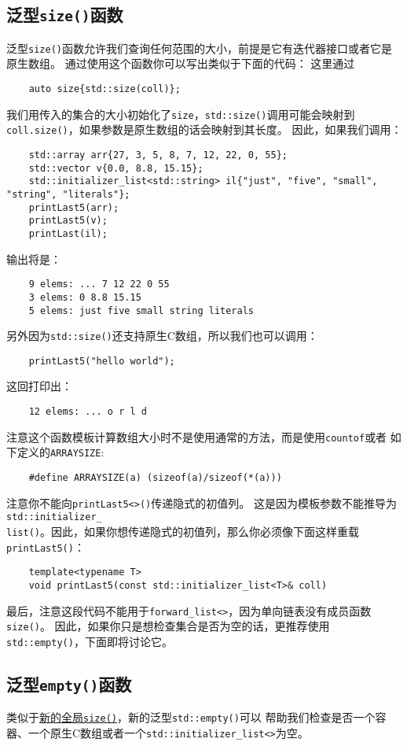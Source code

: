 \subsection{泛型\texttt{size()}函数}\label{ch25.1.1}
泛型\texttt{size()}函数允许我们查询任何范围的大小，前提是它有迭代器接口或者它是原生数组。
通过使用这个函数你可以写出类似于下面的代码：
这里通过
\begin{lstlisting}
    auto size{std::size(coll)};
\end{lstlisting}
我们用传入的集合的大小初始化了\texttt{size}，\texttt{std::size()}调用可能会映射到
\texttt{coll.size()}，如果参数是原生数组的话会映射到其长度。
因此，如果我们调用：
\begin{lstlisting}
    std::array arr{27, 3, 5, 8, 7, 12, 22, 0, 55};
    std::vector v{0.0, 8.8, 15.15};
    std::initializer_list<std::string> il{"just", "five", "small", "string", "literals"};
    printLast5(arr);
    printLast5(v);
    printLast(il);
\end{lstlisting}
输出将是：
\begin{lstlisting}
    9 elems: ... 7 12 22 0 55
    3 elems: 0 8.8 15.15
    5 elems: just five small string literals
\end{lstlisting}
另外因为\texttt{std::size()}还支持原生C数组，所以我们也可以调用：
\begin{lstlisting}
    printLast5("hello world");
\end{lstlisting}
这回打印出：
\begin{lstlisting}
    12 elems: ... o r l d
\end{lstlisting}
注意这个函数模板计算数组大小时不是使用通常的方法，而是使用\texttt{countof}或者
如下定义的\texttt{ARRAYSIZE}:
\begin{lstlisting}
    #define ARRAYSIZE(a) (sizeof(a)/sizeof(*(a)))
\end{lstlisting}
注意你不能向\texttt{printLast5<>()}传递隐式的初值列。
这是因为模板参数不能推导为\texttt{std::initializer\_\\
list()}。因此，如果你想传递隐式的初值列，那么你必须像下面这样重载\texttt{printLast5()}：
\begin{lstlisting}
    template<typename T>
    void printLast5(const std::initializer_list<T>& coll)
\end{lstlisting}
最后，注意这段代码不能用于\texttt{forward\_list<>}，因为单向链表没有成员函数\texttt{size()}。
因此，如果你只是想检查集合是否为空的话，更推荐使用\texttt{std::empty()}，下面即将讨论它。

\subsection{泛型\texttt{empty()}函数}
类似于\hyperref[ch25.1.1]{新的全局\texttt{size()}}，新的泛型\texttt{std::empty()}可以
帮助我们检查是否一个容器、一个原生C数组或者一个\texttt{std::initializer\_list<>}为空。

